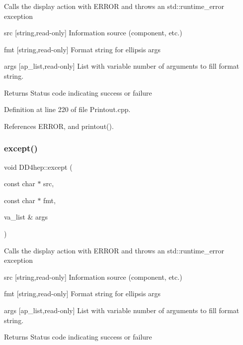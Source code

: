 Calls the display action with E\+R\+R\+OR and throws an std\+::runtime\+\_\+error exception \begin{DoxyItemize}
\item src \mbox{[}string,read-\/only\mbox{]} Information source (component, etc.) \item fmt \mbox{[}string,read-\/only\mbox{]} Format string for ellipsis args \item args \mbox{[}ap\+\_\+list,read-\/only\mbox{]} List with variable number of arguments to fill format string. \begin{DoxyReturn}{Returns}
Status code indicating success or failure 
\end{DoxyReturn}
\end{DoxyItemize}


Definition at line 220 of file Printout.\+cpp.



References E\+R\+R\+OR, and printout().

\hypertarget{namespace_d_d4hep_a0ecfb76ddfb873affe80600e3d8912dd}{}\label{namespace_d_d4hep_a0ecfb76ddfb873affe80600e3d8912dd} 
\subsubsection{\texorpdfstring{except()}{except()}\hspace{0.1cm}{\footnotesize\ttfamily [4/4]}}
{\footnotesize\ttfamily void D\+D4hep\+::except (\begin{DoxyParamCaption}\item[{const char $\ast$}]{src,  }\item[{const char $\ast$}]{fmt,  }\item[{va\+\_\+list \&}]{args }\end{DoxyParamCaption})}

Calls the display action with E\+R\+R\+OR and throws an std\+::runtime\+\_\+error exception \begin{DoxyItemize}
\item src \mbox{[}string,read-\/only\mbox{]} Information source (component, etc.) \item fmt \mbox{[}string,read-\/only\mbox{]} Format string for ellipsis args \item args \mbox{[}ap\+\_\+list,read-\/only\mbox{]} List with variable number of arguments to fill format string. \begin{DoxyReturn}{Returns}
Status code indicating success or failure 
\end{DoxyReturn}
\end{DoxyItemize}


